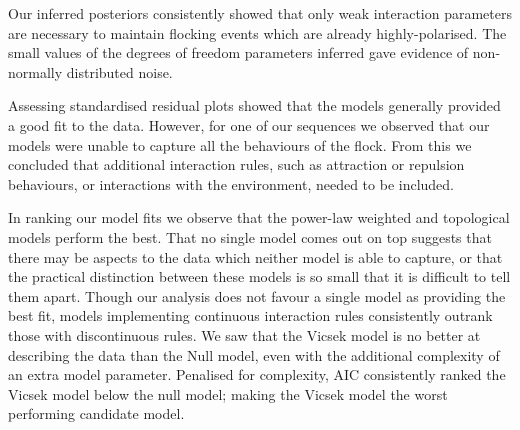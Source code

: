 Our inferred posteriors consistently showed that only weak interaction
parameters are necessary to maintain flocking events which are already
highly-polarised. The small values of the degrees of freedom parameters
inferred gave evidence of non-normally distributed noise.

Assessing standardised residual plots showed that the models generally
provided a good fit to the data. However, for one of our sequences we
observed that our models were unable to capture all the behaviours of the
flock. From this we concluded that additional interaction rules, such as
attraction or repulsion behaviours, or interactions with the environment,
needed to be included.

In ranking our model fits we observe that the power-law weighted and
topological models perform the best. That no single model comes out on top
suggests that there may be aspects to the data which neither model is able to
capture, or that the practical distinction between these models is so small
that it is difficult to tell them apart. Though our analysis does not favour a
single model as providing the best fit, models implementing continuous
interaction rules consistently outrank those with discontinuous rules. We saw
that the Vicsek model is no better at describing the data than the Null model,
even with the additional complexity of an extra model parameter. Penalised for
complexity, AIC consistently ranked the Vicsek model below the null model;
making the Vicsek model the worst performing candidate model.

